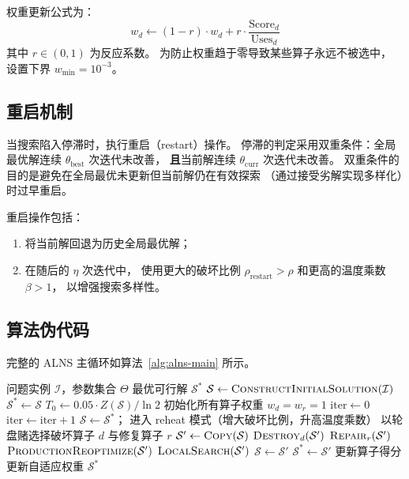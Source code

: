 \documentclass{article}
\begin{document}
权重更新公式为：
\begin{equation}
  w_d \leftarrow (1 - r) \cdot w_d + r \cdot \frac{\text{Score}_d}{\text{Uses}_d}
  \label{eq:weight-update}
\end{equation}
其中 $r \in (0,1)$ 为反应系数。
为防止权重趋于零导致某些算子永远不被选中，
设置下界 $w_{\min} = 10^{-3}$。

\subsection{重启机制}

当搜索陷入停滞时，执行重启（restart）操作。
停滞的判定采用双重条件：全局最优解连续
$\theta_{\text{best}}$ 次迭代未改善，
\textbf{且}当前解连续 $\theta_{\text{curr}}$ 次迭代未改善。
双重条件的目的是避免在全局最优未更新但当前解仍在有效探索
（通过接受劣解实现多样化）时过早重启。

重启操作包括：
\begin{enumerate}
  \item 将当前解回退为历史全局最优解；
  \item 在随后的 $\eta$ 次迭代中，
    使用更大的破坏比例 $\rho_{\text{restart}} > \rho$
    和更高的温度乘数 $\beta > 1$，
    以增强搜索多样性。
\end{enumerate}

\subsection{算法伪代码}

完整的 ALNS 主循环如算法~\ref{alg:alns-main} 所示。

\begin{algorithm}[htbp]
\caption{ALNS 求解 MVPRP 的主循环}
\label{alg:alns-main}
\begin{algorithmic}[1]
\REQUIRE 问题实例 $\mathcal{I}$，参数集合 $\Theta$
\ENSURE 最优可行解 $\mathcal{S}^*$
\STATE $\mathcal{S} \leftarrow \textsc{ConstructInitialSolution}(\mathcal{I})$
\STATE $\mathcal{S}^* \leftarrow \mathcal{S}$
\STATE $T_0 \leftarrow 0.05 \cdot Z(\mathcal{S}) / \ln 2$
\STATE 初始化所有算子权重 $w_d = w_r = 1$
\STATE $\text{iter} \leftarrow 0$
  \STATE $\text{iter} \leftarrow \text{iter} + 1$
    \STATE $\mathcal{S} \leftarrow \mathcal{S}^*$；
    进入 reheat 模式（增大破坏比例，升高温度乘数）
  \ENDIF
  \STATE 以轮盘赌选择破坏算子 $d$ 与修复算子 $r$
  \STATE $\mathcal{S}' \leftarrow \textsc{Copy}(\mathcal{S})$
  \STATE $\textsc{Destroy}_d(\mathcal{S}')$
  \STATE $\textsc{Repair}_r(\mathcal{S}')$
  \STATE $\textsc{ProductionReoptimize}(\mathcal{S}')$
  \STATE $\textsc{LocalSearch}(\mathcal{S}')$
      \STATE $\mathcal{S} \leftarrow \mathcal{S}'$
    \ENDIF
      \STATE $\mathcal{S}^* \leftarrow \mathcal{S}'$
    \ENDIF
  \ENDIF
  \STATE 更新算子得分
    \STATE 更新自适应权重
  \ENDIF
\ENDWHILE
\RETURN $\mathcal{S}^*$
\end{algorithmic}
\end{algorithm}
\end{document}

